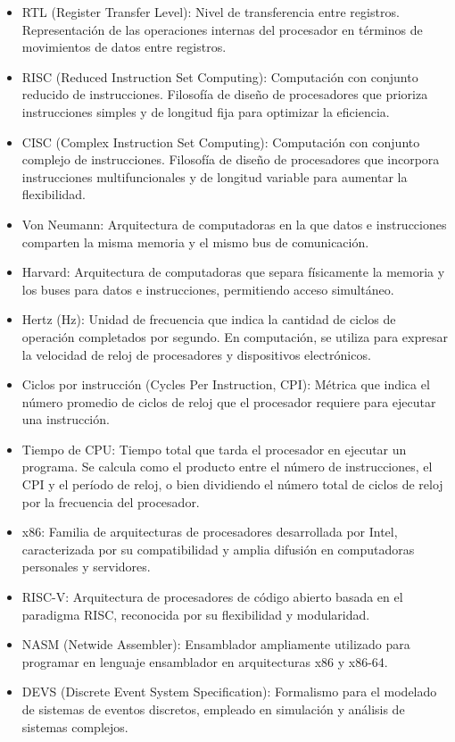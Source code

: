 \documentclass[12pt,oneside]{templates/unerthesis}
\begin{document}
\begin{itemize}
\item
  RTL (Register Transfer Level): Nivel de transferencia entre registros. Representación de las operaciones internas del procesador en términos de movimientos de datos entre registros.
\item
  RISC (Reduced Instruction Set Computing): Computación con conjunto reducido de instrucciones. Filosofía de diseño de procesadores que prioriza instrucciones simples y de longitud fija para optimizar la eficiencia.
\item
  CISC (Complex Instruction Set Computing): Computación con conjunto complejo de instrucciones. Filosofía de diseño de procesadores que incorpora instrucciones multifuncionales y de longitud variable para aumentar la flexibilidad.
\item
  Von Neumann: Arquitectura de computadoras en la que datos e instrucciones comparten la misma memoria y el mismo bus de comunicación.
\item
  Harvard: Arquitectura de computadoras que separa físicamente la memoria y los buses para datos e instrucciones, permitiendo acceso simultáneo.
\item
  Hertz (Hz): Unidad de frecuencia que indica la cantidad de ciclos de operación completados por segundo. En computación, se utiliza para expresar la velocidad de reloj de procesadores y dispositivos electrónicos.
\item
  Ciclos por instrucción (Cycles Per Instruction, CPI): Métrica que indica el número promedio de ciclos de reloj que el procesador requiere para ejecutar una instrucción.
\item
  Tiempo de CPU: Tiempo total que tarda el procesador en ejecutar un programa. Se calcula como el producto entre el número de instrucciones, el CPI y el período de reloj, o bien dividiendo el número total de ciclos de reloj por la frecuencia del procesador.
\item
  x86: Familia de arquitecturas de procesadores desarrollada por Intel, caracterizada por su compatibilidad y amplia difusión en computadoras personales y servidores.
\item
  RISC-V: Arquitectura de procesadores de código abierto basada en el paradigma RISC, reconocida por su flexibilidad y modularidad.
\item
  NASM (Netwide Assembler): Ensamblador ampliamente utilizado para programar en lenguaje ensamblador en arquitecturas x86 y x86-64.
\item
  DEVS (Discrete Event System Specification): Formalismo para el modelado de sistemas de eventos discretos, empleado en simulación y análisis de sistemas complejos.

\end{itemize}
\end{document}
